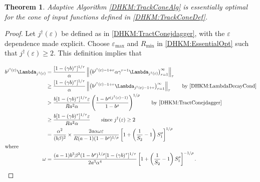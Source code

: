 \documentclass[USenglish]{article}
\theoremstyle{dgthm}
\newtheorem{theorem}{Theorem}
\theoremstyle{dgthm}
\theoremstyle{dgthm}
\theoremstyle{dgthm}
\theoremstyle{dgdef}
\theoremstyle{definition}
\newcommand{\DHKMnorm}[2][{}]{\ensuremath{\left \lVert #2 \right \rVert}_{#1}}
\begin{document}
\begin{theorem}
\label{DHKM:TrackConeAlgOptThm}
Adaptive Algorithm \ref{DHKM:TrackConeAlg} is essentially optimal for the cone of input functions defined in \eqref{DHKM:TrackConeDef}.
\end{theorem}
\begin{proof}
Let $j^\dagger(\varepsilon)$ be defined as in \eqref{DHKM:TractConejdagger}, with the $\varepsilon$ dependence made explicit.  Choose $\varepsilon_{\max}$ and $R_{\min}$ in \eqref{DHKM:EssentialOpt} such that $j^\dagger(\varepsilon) \ge 2$.  This definition implies that

\begin{align*}
    b^{j^\dagger(\varepsilon)} \Lambda_{j^\dagger(\varepsilon) } 
   & = \frac{[1 - (\gamma b)^\tau]^{1/\tau}}{\alpha}
   \DHKMnorm[\tau]{ \bigl(b^{j^\dagger(\varepsilon)-1+r} \alpha \gamma^{r-1} \Lambda_{j^\dagger(\varepsilon)} \bigr)_{r=1}^\infty}
    \\
    & \ge \frac{[1 - (\gamma b)^\tau]^{1/\tau}}{\alpha}  \DHKMnorm[\tau]{ \bigl(b^{j^\dagger(\varepsilon)-1+r}\Lambda_{j^\dagger(\varepsilon)-1+r} \bigr)_{r=1}^\infty} \qquad \text{by \eqref{DHKM:LambdaDecayCond}} 
    \\
    &
    > \frac{b [1 - (\gamma b)^\tau]^{1/\tau} \varepsilon}{Ra^2 \alpha} \left( \frac{1 - b^{\rho(j^\dagger(\varepsilon)-1)}}{1 - b^\rho} \right)^{1/\rho} \qquad \text{by \eqref{DHKM:TractConejdagger}}
    \\
    &
    \ge \frac{b [1 - (\gamma b)^\tau]^{1/\tau} \varepsilon}{Ra^2 \alpha} \qquad \text{since } j^\dagger(\varepsilon) \ge 2
    \\
    & =   \frac{\alpha^2}{(b\beta)^2} \times \frac{2a \alpha \omega \varepsilon}{R(a-1)(1 - b^\rho)^{1/\rho}}  \left[1 + \left(\frac 1 {S_2} -1 \right) S_1^\rho \right]^{1/\rho}
    \\
    \intertext{where }
   \omega  & = \frac{(a-1)b^3 \beta^2 (1 - b^\rho)^{1/\rho} [1 - (\gamma b)^\tau]^{1/\tau}}{2a^3 \alpha^4 } \left[1 + \left(\frac 1 {S_2} -1 \right) S_1^\rho \right]^{-1/\rho}.
\end{align*}


\end{proof}
\end{document}
